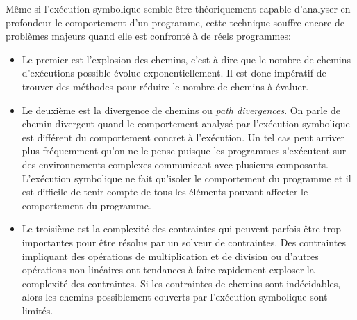 Même si l'exécution symbolique semble être théoriquement capable d'analyser en profondeur le comportement d'un programme, cette technique souffre encore de problèmes majeurs quand elle est confronté à de réels programmes:\\
\begin{itemize}
\item Le premier est l'explosion des chemins, c'est à dire que le nombre de chemins d'exécutions possible évolue exponentiellement. Il est donc impératif de trouver des méthodes pour réduire le nombre de chemins à évaluer.\\
\item Le deuxième est la divergence de chemins ou \textit{path divergences}. On parle de chemin divergent quand le comportement analysé par l'exécution symbolique est différent du comportement concret à l'exécution. Un tel cas peut arriver plus fréquemment qu'on ne le pense puisque les programmes s'exécutent sur des environnements complexes communicant avec plusieurs composants. L'exécution symbolique ne fait qu'isoler le comportement du programme et il est difficile de tenir compte de tous les éléments pouvant affecter le comportement du programme.\\
\item Le troisième est la complexité des contraintes qui peuvent parfois être trop importantes pour être résolus par un solveur de contraintes. Des contraintes impliquant des opérations de multiplication et de division ou d'autres opérations non linéaires ont tendances à faire rapidement exploser la complexité des contraintes. Si les contraintes de chemins sont indécidables, alors les chemins possiblement couverts par l'exécution symbolique sont limités.

\end{itemize}

